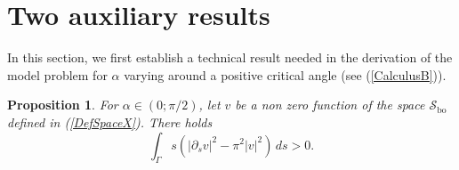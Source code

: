 \documentclass[11pt,a4paper]{article}
\newcommand{\mrm}[1]{\mathrm{#1}}
\newcommand{\mX}{\mathscr{S}}
\newtheorem{proposition}[theorem]{Proposition}
\begin{document}
\section{Two auxiliary results}\label{SectionAuxRes}
In this section, we first establish a technical result needed in the derivation of the model problem for $\alpha$ varying around a positive critical angle (see (\ref{CalculusB})).

\begin{proposition}\label{PropositionSigneIntegral}
For $\alpha\in(0;\pi/2)$, let $v$ be a non zero function of the space $\mX_{\mrm{bo}}$ defined in (\ref{DefSpaceX}). There holds
\begin{equation}\label{MainIntegral}
\int_{\Gamma}s\left(  |\partial_sv|^2-\pi^2|v|^2\right)\,ds>0.
\end{equation}
\end{proposition}
\end{document}
